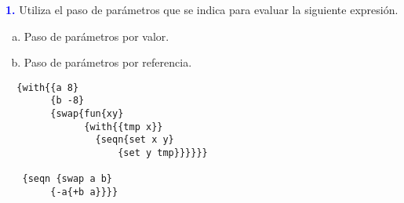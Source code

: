 \textbf{\textcolor{blue}{1.}} \Large
Utiliza el paso de parámetros que se indica para evaluar la siguiente expresión.
\begin{enumerate}[a.]
    \item Paso de parámetros por valor.
    \item Paso de parámetros por referencia.
\end{enumerate}
\begin{lstlisting}
  {with{{a 8}
        {b -8}
        {swap{fun{xy}
              {with{{tmp x}}
                {seqn{set x y}
                    {set y tmp}}}}}}

   {seqn {swap a b}
        {-a{+b a}}}}
\end{lstlisting}
